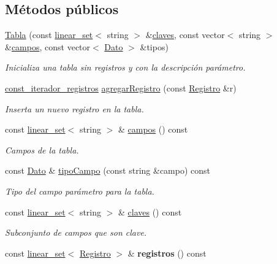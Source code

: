 \subsection*{Métodos públicos}
\begin{DoxyCompactItemize}
\item 
\hyperlink{classTabla_a5a7be353082561e06a877b2255c0ea5c}{Tabla} (const \hyperlink{classlinear__set}{linear\-\_\-set}$<$ string $>$ \&\hyperlink{classTabla_aaea7c833fd1f68742785482809c8667a}{claves}, const vector$<$ string $>$ \&\hyperlink{classTabla_a3436d172652646a83d8035d1c68b9073}{campos}, const vector$<$ \hyperlink{classDato}{Dato} $>$ \&tipos)
\begin{DoxyCompactList}\small\item\em Inicializa una tabla sin registros y con la descripción parámetro. \end{DoxyCompactList}\item 
\hyperlink{classTabla_1_1const__iterador__registros}{const\-\_\-iterador\-\_\-registros} \hyperlink{classTabla_a99345e41702e7e9984732c6f3672e386}{agregar\-Registro} (const \hyperlink{classRegistro}{Registro} \&r)
\begin{DoxyCompactList}\small\item\em Inserta un nuevo registro en la tabla. \end{DoxyCompactList}\item 
const \hyperlink{classlinear__set}{linear\-\_\-set}$<$ string $>$ \& \hyperlink{classTabla_a3436d172652646a83d8035d1c68b9073}{campos} () const 
\begin{DoxyCompactList}\small\item\em Campos de la tabla. \end{DoxyCompactList}\item 
const \hyperlink{classDato}{Dato} \& \hyperlink{classTabla_a256a50a84ffbf43b570c568bcaf5f52f}{tipo\-Campo} (const string \&campo) const 
\begin{DoxyCompactList}\small\item\em Tipo del campo parámetro para la tabla. \end{DoxyCompactList}\item 
const \hyperlink{classlinear__set}{linear\-\_\-set}$<$ string $>$ \& \hyperlink{classTabla_aaea7c833fd1f68742785482809c8667a}{claves} () const 
\begin{DoxyCompactList}\small\item\em Subconjunto de campos que son clave. \end{DoxyCompactList}\item 
\hypertarget{classTabla_a7bcdeb00d2fe040e454468d526cce66c}{const \hyperlink{classlinear__set}{linear\-\_\-set}$<$ \hyperlink{classRegistro}{Registro} $>$ \& {\bfseries registros} () const }\label{classTabla_a7bcdeb00d2fe040e454468d526cce66c}


\end{DoxyCompactItemize}
